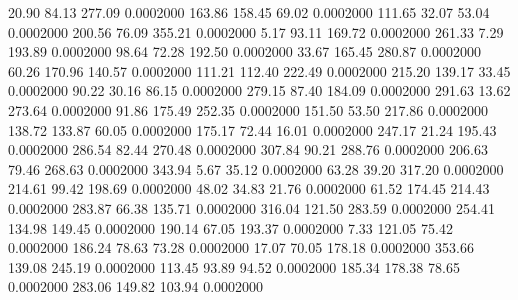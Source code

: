   20.90   84.13  277.09   0.0002000
 163.86  158.45   69.02   0.0002000
 111.65   32.07   53.04   0.0002000
 200.56   76.09  355.21   0.0002000
   5.17   93.11  169.72   0.0002000
 261.33    7.29  193.89   0.0002000
  98.64   72.28  192.50   0.0002000
  33.67  165.45  280.87   0.0002000
  60.26  170.96  140.57   0.0002000
 111.21  112.40  222.49   0.0002000
 215.20  139.17   33.45   0.0002000
  90.22   30.16   86.15   0.0002000
 279.15   87.40  184.09   0.0002000
 291.63   13.62  273.64   0.0002000
  91.86  175.49  252.35   0.0002000
 151.50   53.50  217.86   0.0002000
 138.72  133.87   60.05   0.0002000
 175.17   72.44   16.01   0.0002000
 247.17   21.24  195.43   0.0002000
 286.54   82.44  270.48   0.0002000
 307.84   90.21  288.76   0.0002000
 206.63   79.46  268.63   0.0002000
 343.94    5.67   35.12   0.0002000
  63.28   39.20  317.20   0.0002000
 214.61   99.42  198.69   0.0002000
  48.02   34.83   21.76   0.0002000
  61.52  174.45  214.43   0.0002000
 283.87   66.38  135.71   0.0002000
 316.04  121.50  283.59   0.0002000
 254.41  134.98  149.45   0.0002000
 190.14   67.05  193.37   0.0002000
   7.33  121.05   75.42   0.0002000
 186.24   78.63   73.28   0.0002000
  17.07   70.05  178.18   0.0002000
 353.66  139.08  245.19   0.0002000
 113.45   93.89   94.52   0.0002000
 185.34  178.38   78.65   0.0002000
 283.06  149.82  103.94   0.0002000
